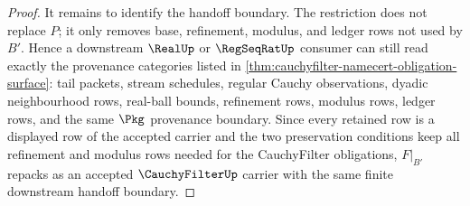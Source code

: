 \begin{proof}
It remains to identify the handoff boundary. The restriction does not replace
$P$; it only removes base, refinement, modulus, and ledger rows not used by
$B'$. Hence a downstream $\RealUp$ or $\RegSeqRatUp$ consumer can still read
exactly the provenance categories listed in
\autoref{thm:cauchyfilter-namecert-obligation-surface}: tail packets, stream
schedules, regular Cauchy observations, dyadic neighbourhood rows, real-ball
bounds, refinement rows, modulus rows, ledger rows, and the same $\Pkg$
provenance boundary. Since every retained row is a displayed row of the
accepted carrier and the two preservation conditions keep all refinement and
modulus rows needed for the CauchyFilter obligations, $F|_{B'}$ repacks as an
accepted $\CauchyFilterUp$ carrier with the same finite downstream handoff
boundary.
\end{proof}
